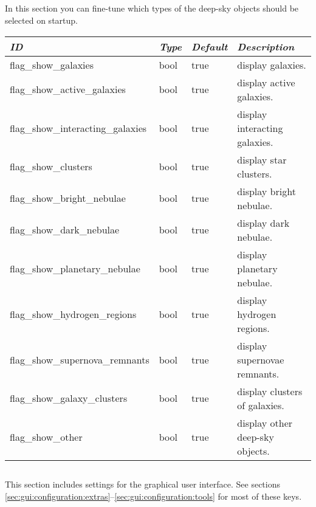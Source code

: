\subsection{}
In this section you can fine-tune which types of the deep-sky objects should be selected on startup.

\noindent%
\begin{tabularx}{\textwidth}{l|l|l|X}\toprule
\emph{ID} & \emph{Type} & \emph{Default} & \emph{Description}\\\midrule
flag\_show\_galaxies              & bool & true & display galaxies.\\%
flag\_show\_active\_galaxies      & bool & true & display active galaxies. \\%
flag\_show\_interacting\_galaxies & bool & true & display interacting galaxies.  \\%
flag\_show\_clusters              & bool & true & display star clusters.  \\%
flag\_show\_bright\_nebulae       & bool & true & display bright nebulae.  \\%
flag\_show\_dark\_nebulae         & bool & true & display dark nebulae.  \\%
flag\_show\_planetary\_nebulae    & bool & true & display planetary nebulae.  \\%
flag\_show\_hydrogen\_regions     & bool & true & display hydrogen regions. \\%
flag\_show\_supernova\_remnants   & bool & true & display supernovae remnants. \\%
flag\_show\_galaxy\_clusters      & bool & true & display clusters of galaxies. \\%
flag\_show\_other                 & bool & true & display other deep-sky objects.  \\\bottomrule
\end{tabularx}

\subsection{}

This section includes settings for the graphical user interface. See sections \ref{sec:gui:configuration:extras}--\ref{sec:gui:configuration:tools} for most of these keys.

